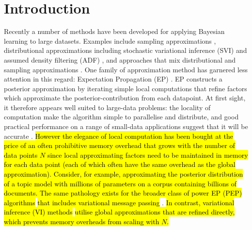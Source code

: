\section{Introduction}


Recently a number of methods have been developed for applying Bayesian learning to large datasets. Examples include sampling approximations \cite{ahn:distributedMCMC, bardenet:MCMC}, distributional approximations including stochastic variational inference (SVI) \cite{hoffman:svi} and assumed density filtering (ADF) \cite{miguel:pbp}, and approaches that mix distributional and sampling approximations \cite{gelman:dep,xu:sms}. 
%
One family of approximation method has garnered less attention in this regard: Expectation Propagation (EP) \cite{minka:ep, opper:ec}. EP constructs a posterior approximation by iterating simple local computations that refine factors which approximate the posterior-contribution from each datapoint. At first sight, it therefore appears well suited to large-data problems: the locality of computation make the algorithm simple to parallelise and distribute, and good practical performance on a range of small-data applications suggest that it will be accurate \cite{kuss:gpep,barthelme:ep_likelihood,cunningham:gaussianEP}. 
%
\hl{However the elegance of local computation has been bought at the price of an often prohibitive memory overhead that grows with the number of data points $N$ since local approximating factors need to be maintained in memory for each data point (each of which often have the same overhead as the global approximation). Consider, for example, approximating the posterior distribution of a topic model with millions of parameters on a corpus containing billions of documents. The same pathology exists for the broader class of power EP (PEP) algorithms } \cite{minka:powerep} \hl{that includes variational message passing} \cite{winn:vmp}. \hl{In contrast, variational inference (VI) methods} \cite{jordan:variational,beal:variational} \hl{utilise global approximations that are refined directly, which prevents memory overheads from scaling with $N$. }


